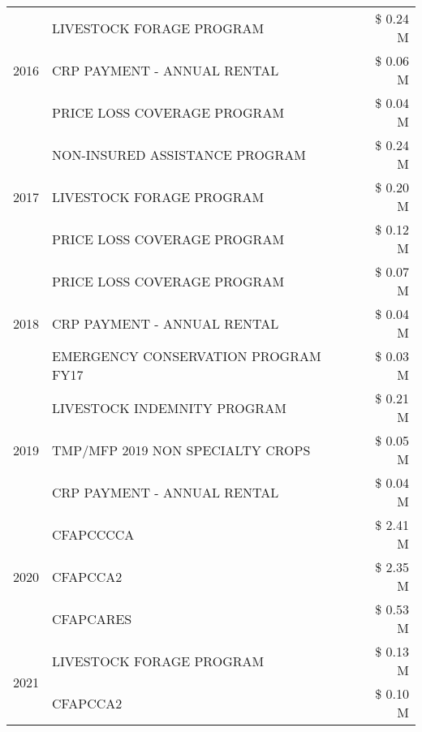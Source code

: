 \begin{tabular}{llr}
\cline{1-3}
\multirow[t]{3}{*}{2016} & LIVESTOCK FORAGE PROGRAM & \$ 0.24 M \\
 & CRP PAYMENT - ANNUAL RENTAL & \$ 0.06 M \\
 & PRICE LOSS COVERAGE PROGRAM & \$ 0.04 M \\
\cline{1-3}
\multirow[t]{3}{*}{2017} & NON-INSURED ASSISTANCE PROGRAM & \$ 0.24 M \\
 & LIVESTOCK FORAGE PROGRAM & \$ 0.20 M \\
 & PRICE LOSS COVERAGE PROGRAM & \$ 0.12 M \\
\cline{1-3}
\multirow[t]{3}{*}{2018} & PRICE LOSS COVERAGE PROGRAM & \$ 0.07 M \\
 & CRP PAYMENT - ANNUAL RENTAL & \$ 0.04 M \\
 & EMERGENCY CONSERVATION PROGRAM FY17 & \$ 0.03 M \\
\cline{1-3}
\multirow[t]{3}{*}{2019} & LIVESTOCK INDEMNITY PROGRAM & \$ 0.21 M \\
 & TMP/MFP 2019 NON SPECIALTY CROPS & \$ 0.05 M \\
 & CRP PAYMENT - ANNUAL RENTAL & \$ 0.04 M \\
\cline{1-3}
\multirow[t]{3}{*}{2020} & CFAPCCCCA & \$ 2.41 M \\
 & CFAPCCA2 & \$ 2.35 M \\
 & CFAPCARES & \$ 0.53 M \\
\cline{1-3}
\multirow[t]{2}{*}{2021} & LIVESTOCK FORAGE PROGRAM & \$ 0.13 M \\
 & CFAPCCA2 & \$ 0.10 M \\
\cline{1-3}
\bottomrule
\end{tabular}
